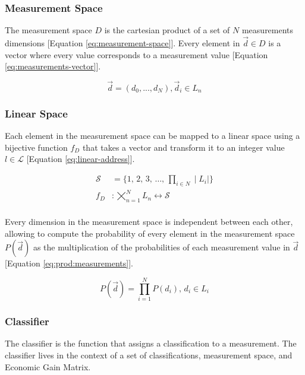 \documentclass[letterpaper, conference]{IEEEtran}
\begin{document}
\subsubsection{Measurement Space}
The measurement space $D$ is the cartesian product of a set of $N$ measurements dimensions [Equation \ref{eq:measurement-space}]. Every element in $\vec{d} \in D$ is a vector where every value corresponds to a measurement value [Equation \ref{eq:measurements-vector}].

\begin{equation}\label{eq:measurements-vector}
  \vec{d} = (d_0, ..., d_N), \vec{d}_i \in L_n
\end{equation}

\subsubsection{Linear Space}
Each element in the measurement space can be mapped to a linear space using a bijective function $f_D$ that takes a vector and transform it to an integer value $l \in \mathcal{L}$ [Equation \ref{eq:linear-address}].

\begin{equation}\label{eq:linear-address}
  \begin{aligned}
  \mathcal{S} &= \{1,\, 2,\, 3,\, \dots,\, \prod_{i \in N} \mid L_i \mid\} \\
  f_D&: \bigtimes_{n=1}^{N} L_n \longleftrightarrow \mathcal{S} \\
  \end{aligned}
\end{equation}

Every dimension in the measurement space is independent between each other, allowing to compute the probability of every element in the measurement space $P(\vec{d})$ as the multiplication of the probabilities of each measurement value in $\vec{d}$ [Equation \ref{eq:prod:measurements}].

\begin{equation}\label{eq:prod:measurements}
  P(\vec{d}) = \prod_{i = 1}^{N} P(d_i),\, d_i \in L_i
\end{equation}

\subsubsection{Classifier}
The classifier is the function that assigns a classification to a measurement. The classifier lives in the context of a set of classifications, measurement space, and Economic Gain Matrix.
\end{document}
